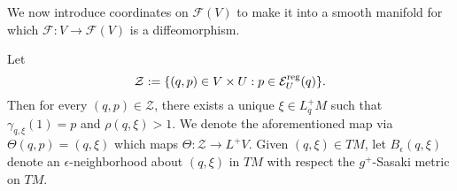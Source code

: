 We now introduce coordinates on $\mathcal{F}(V)$ to make it into a smooth manifold for which $\mathcal{F}:V\to\mathcal{F}(V)$ is a diffeomorphism.

Let
$$\mathcal{Z}:=\{(q,p)\in V\times U:p\in\mathcal{E}_U^{\text{reg}}(q)\}.$$
Then for every $(q,p)\in\mathcal{Z}$, there exists a unique $\xi\in L_q^+M$ such that $\gamma_{q,\xi}(1)=p$ and $\rho(q,\xi)>1$.  We denote the aforementioned map via $\Theta(q,p)=(q,\xi)$ which maps $\Theta:\mathcal{Z}\to L^+V$.  Given $(q,\xi)\in TM$, let $B_\epsilon(q,\xi)$ denote an $\epsilon$-neighborhood about $(q,\xi)$ in $TM$ with respect the $g^+$-Sasaki metric on $TM$.

















